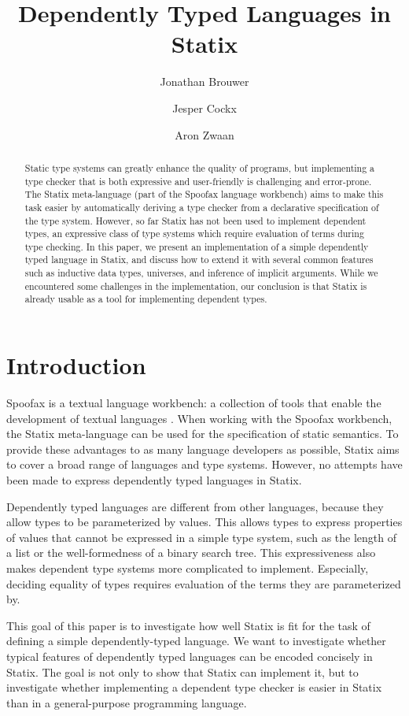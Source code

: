 \documentclass[a4paper,UKenglish,cleveref, autoref, thm-restate]{oasics-v2021}
\title{Dependently Typed Languages in Statix}
\author{Jonathan Brouwer}{Delft University of Technology, The Netherlands \and \url{http://jonathanb.nl}}{j.t.brouwer@student.tudelft.nl}{https://orcid.org/0000-0002-2469-548X}{}
\author{Jesper Cockx}{Delft University of Technology, The Netherlands \and \url{http://jesper.sikanda.be}}{j.g.h.cockx@tudelft.nl}{https://orcid.org/0000-0003-3862-4073}{}
\author{Aron Zwaan}{Delft University of Technology, The Netherlands \and \url{http://aronzwaan.github.io}}{a.s.zwaan@tudelft.nl}{https://orcid.org/0000-0002-1818-4245}{}
\begin{document}
\maketitle

\begin{abstract}
Static type systems can greatly enhance the quality of programs, but implementing a type checker that is both expressive and user-friendly is challenging and error-prone. The Statix meta-language (part of the Spoofax language workbench) aims to make this task easier by automatically deriving a type checker from a declarative specification of the type system. However, so far Statix has not been used to implement dependent types, an expressive class of type systems which require evaluation of terms during type checking. In this paper, we present an implementation of a simple dependently typed language in Statix, and discuss how to extend it with several common features such as inductive data types, universes, and inference of implicit arguments. While we encountered some challenges in the implementation, our conclusion is that Statix is already usable as a tool for implementing dependent types.
\end{abstract}

\section{Introduction}

Spoofax is a textual language workbench: \label{key}a collection of tools that enable the development of textual languages \cite{spoofax}. When working with the Spoofax workbench, the Statix meta-language can be used for the specification of static semantics. To provide these advantages to as many language developers as possible, Statix aims to cover a broad range of languages and type systems. However, no attempts have been made to express dependently typed languages in Statix. 

Dependently typed languages are different from other languages, because they allow types to be parameterized by values. This allows types to express properties of values that cannot be expressed in a simple type system, such as the length of a list or the well-formedness of a binary search tree. This expressiveness also makes dependent type systems more complicated to implement. Especially, deciding equality of types requires evaluation of the terms they are parameterized by. 

This goal of this paper is to investigate how well Statix is fit for the task of defining a simple dependently-typed language. We want to investigate whether typical features of dependently typed languages can be encoded concisely in Statix. The goal is not only to show that Statix can implement it, but to investigate whether implementing a dependent type checker is easier in Statix than in a general-purpose programming language.
\end{document}
